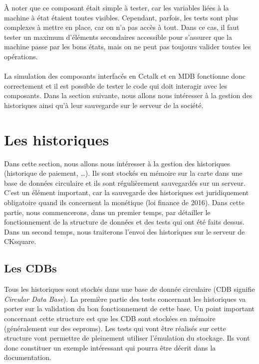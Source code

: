\documentclass[a4paper]{article}
\begin{document}
À noter que ce composant était simple à tester, car les variables liées à la
machine à état étaient toutes visibles. Cependant, parfois, les tests sont plus
complexes à mettre en place, car on n'a pas accès à tout. Dans ce cas, il faut
tester un maximum d'éléments secondaires accessible pour s'assurer que la
machine passe par les bons états, mais on ne peut pas toujours valider toutes les
opérations.\\~\\

La simulation des composants interfacés en Cctalk et en MDB fonctionne donc
correctement et il est possible de tester le code qui doit interagir avec les
composants. Dans la section suivante, nous allons nous intéresser à la gestion
des historiques ainsi qu'à leur sauvegarde sur le serveur de la société.
\section{Les historiques}%

Dans cette section, nous allons nous intéresser à la gestion des historiques
(historique de paiement, \dots). Ils sont stockés en mémoire sur la carte dans
une base de données circulaire et ils sont régulièrement sauvegardés sur un
serveur. C'est un élément important, car la sauvegarde des historiques est
juridiquement obligatoire quand ils concernent la monétique (loi finance de
2016). Dans cette partie, nous commencerons, dans un premier temps, par
détailler le fonctionnement de la structure de données et des tests qui ont
été faits dessus. Dans un second temps, nous traiterons l'envoi des
historiques sur le serveur de CKsquare.

\subsection{Les CDBs}
\label{cdbs}

Tous les historiques sont stockés dans une base de donnée circulaire (CDB
signifie \textit{Circular Data Base}). La première partie des tests concernant
les historiques va porter sur la validation du bon fonctionnement de cette base.
Un point important concernant cette structure est que les CDB sont stockées en
mémoire (généralement sur des eeproms). Les tests qui vont être réalisés sur
cette structure vont permettre de pleinement utiliser l'émulation du stockage.
Ils vont donc constituer un exemple intéressant qui pourra être décrit dans la
documentation.\\
\end{document}
